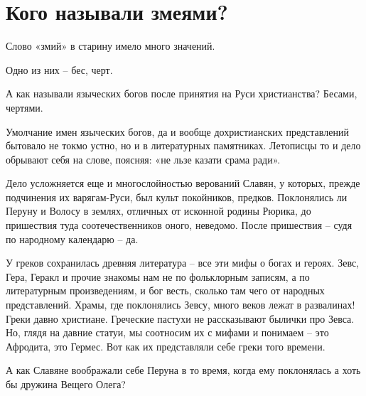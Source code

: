 \chapter{Кого называли змеями?}

Слово «змий» в старину имело много значений.

Одно из них – бес, черт.

А как называли языческих богов после принятия на Руси христианства? Бесами, чертями. 

Умолчание имен языческих богов, да и вообще дохристианских представлений бытовало не токмо устно, но и в литературных памятниках. Летописцы то и дело обрывают себя на слове, поясняя: «не льзе казати срама ради».

Дело усложняется еще и многослойностью верований Славян, у которых, прежде подчинения их варягам-Руси, был культ покойников, предков. Поклонялись ли Перуну и Волосу в землях, отличных от исконной родины Рюрика, до пришествия туда соотечественников оного, неведомо. После пришествия – судя по народному календарю – да.

У греков сохранилась древняя литература – все эти мифы о богах и героях. Зевс, Гера, Геракл и прочие знакомы нам не по фольклорным записям, а по литературным произведениям, и бог весть, сколько там чего от народных представлений. Храмы, где поклонялись Зевсу, много веков лежат в развалинах! Греки давно христиане. Греческие пастухи не рассказывают былички про Зевса. Но, глядя на давние статуи, мы соотносим их с мифами и понимаем – это Афродита, это Гермес. Вот как их представляли себе греки того времени.

А как Славяне воображали себе Перуна в то время, когда ему поклонялась а хоть бы дружина Вещего Олега?






